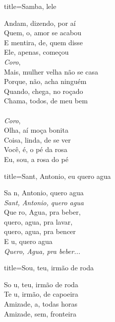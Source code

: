 \documentclass[fontsize=14pt, twoside]{scrreprt}
\begin{document}
\begin{multicols*}{2}
\begin{song}{title={Samba, lele}}
    \begin{verse*}
        Andam, dizendo, por aí\\
        Quem, o, amor se acabou\\
        E mentira, de, quem disse\\
        Ele, apenas, começou\\
        \textit{Coro},\\
        Mais, mulher velha não se casa\\
        Porque, não, acha ninguém\\
        Quando, chega, no roçado\\
        Chama, todos, de meu bem\\
\\
        \textit{Coro},\\
        Olha, aí moça bonita\\
        Coisa, linda, de se ver\\
        Você, é, o pé da rosa\\
        Eu, sou, a rosa do pé\\
        \end{verse*}
\end{song}

\begin{song}{title={Sant, Antonio, eu quero agua}}
        \begin{verse*}
            Sa n, Antonio, quero agua\\
            \textit{Sant, Antonio, quero agua}\\
            Que ro, Agua, pra beber,\\
            quero, agua, pra lavar,\\
            quero, agua, pra bencer\\
            E u, quero agua\\
            \textit{Quero, Agua, pra beber...}\\
        \end{verse*}
\end{song}

\begin{song}{title={Sou, teu, irmão de roda}}
        \begin{verse*}
            So u, teu, irmão de roda\\
            Te u, irmão, de capoeira\\
            Amizade, a, todas horas\\
            Amizade, sem, fronteira\\
        \end{verse*}
\end{song}


\end{multicols*}
\end{document}

